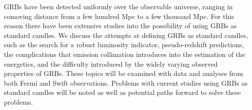


\bigskip



\bigskip

\noindent GRBs have been detected uniformly over the observable universe, ranging in comoving distance from a few hundred Mpc to a few thousand Mpc. For this reason there have been extensive studies into the possibility of using GRBs as standard candles. We discuss the attempts at defining GRBs as standard candles, such as the search for a robust luminosity indicator, pseudo-redshift predictions, the complications that emission collimation introduces into the estimation of the energetics, and the difficulty introduced by the widely varying observed properties of GRBs. These topics will be examined with data and analyses from both Fermi and Swift observations. Problems with current studies using GRBs as standard candles will be noted as well as potential paths forward to solve these problems.
